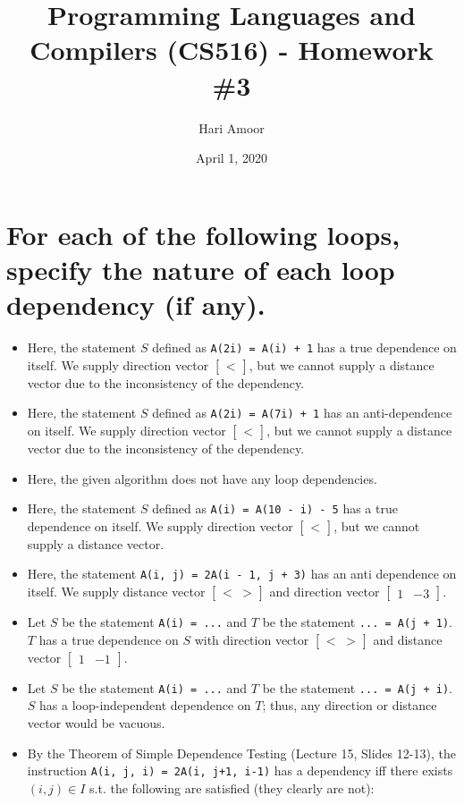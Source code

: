 \documentclass[11pt]{article}
\author{Hari Amoor}
\date{April 1, 2020}
\title{Programming Languages and Compilers (CS516) - Homework \#3}
\begin{document}
\maketitle
\tableofcontents


\section{For each of the following loops, specify the nature of each loop dependency (if any).}
\label{sec:orgc0621d1}
\begin{itemize}
\item Here, the statement \(S\) defined as \texttt{A(2i) = A(i) + 1} has a true dependence on itself. We supply direction vector \(\begin{bmatrix} < \end{bmatrix}\), but we cannot supply a distance vector due to the inconsistency of the dependency.
\item Here, the statement \(S\) defined as \texttt{A(2i) = A(7i) + 1} has an anti-dependence on itself. We supply direction vector \(\begin{bmatrix} < \end{bmatrix}\), but we cannot supply a distance vector due to the inconsistency of the dependency.
\item Here, the given algorithm does not have any loop dependencies.
\item Here, the statement \(S\) defined as \texttt{A(i) = A(10 - i) - 5} has a true dependence on itself. We supply direction vector \(\begin{bmatrix} < \end{bmatrix}\), but we cannot supply a distance vector.
\item Here, the statement \texttt{A(i, j) = 2A(i - 1, j + 3)} has an anti dependence on itself. We supply distance vector \(\begin{bmatrix} < & > \end{bmatrix}\) and direction vector \(\begin{bmatrix} 1 & -3 \end{bmatrix}\).
\item Let \(S\) be the statement \texttt{A(i) = ...} and \(T\) be the statement \texttt{... = A(j + 1)}. \(T\) has a true dependence on \(S\) with direction vector \(\begin{bmatrix} < & > \end{bmatrix}\) and distance vector \(\begin{bmatrix} 1 & -1 \end{bmatrix}\).
\item Let \(S\) be the statement \texttt{A(i) = ...} and \(T\) be the statement \texttt{... = A(j + i)}. \(S\) has a loop-independent dependence on \(T\); thus, any direction or distance vector would be vacuous.
\item By the Theorem of Simple Dependence Testing (Lecture 15, Slides 12-13), the instruction \texttt{A(i, j, i) = 2A(i, j+1, i-1)} has a dependency iff there exists \((i, j) \in I\) s.t. the following are satisfied (they clearly are not):
\end{itemize}
\end{document}
